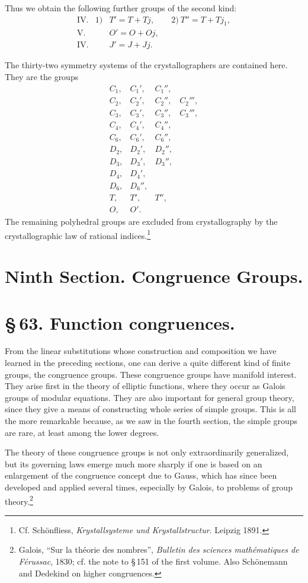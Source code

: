 \documentclass[11pt]{article}
\begin{document}
Thus we obtain the following further groups of the second kind:
\[
\begin{array}{lll}
\mathrm{IV}.&1)&T'=T+Tj,\qquad 2)\ T''=T+Tj_1,\\
\mathrm{V}.&&O'=O+Oj,\\
\mathrm{IV}.&&J'=J+Jj.
\end{array}
\]

The thirty-two symmetry systems of the crystallographers are contained here. They are the groups
\[
\begin{array}{llll}
C_1,&C_1',&C_1'',\\
C_2,&C_2',&C_2'',&C_2''',\\
C_3,&C_3',&C_3'',&C_3''',\\
C_4,&C_4',&C_4'',\\
C_6,&C_6',&C_6'',\\[0.3em]
D_2,&D_2',&D_2'',\\
D_3,&D_3',&D_3'',\\
D_4,&D_4',\\
D_6,&D_6'',\\
T,&T',&T'',\\
O,&O'.
\end{array}
\]
The remaining polyhedral groups are excluded from crystallography by the crystallographic law of rational indices.\footnote{Cf. Schönfliess, \emph{Krystallsysteme und Krystallstructur}. Leipzig 1891.}


\section*{Ninth Section. Congruence Groups.}

\section*{\S\,63. Function congruences.}

From the linear substitutions whose construction and composition we have learned in the preceding sections, one can derive a quite different kind of finite groups, the congruence groups. These congruence groups have manifold interest. They arise first in the theory of elliptic functions, where they occur as Galois groups of modular equations. They are also important for general group theory, since they give a means of constructing whole series of simple groups. This is all the more remarkable because, as we saw in the fourth section, the simple groups are rare, at least among the lower degrees.

The theory of these congruence groups is not only extraordinarily generalized, but its governing laws emerge much more sharply if one is based on an enlargement of the congruence concept due to Gauss, which has since been developed and applied several times, especially by Galois, to problems of group theory.\footnote{Galois, ``Sur la théorie des nombres'', \emph{Bulletin des sciences mathématiques de Férussac}, 1830; cf. the note to \S\,151 of the first volume. Also Schönemann and Dedekind on higher congruences.}
\end{document}
